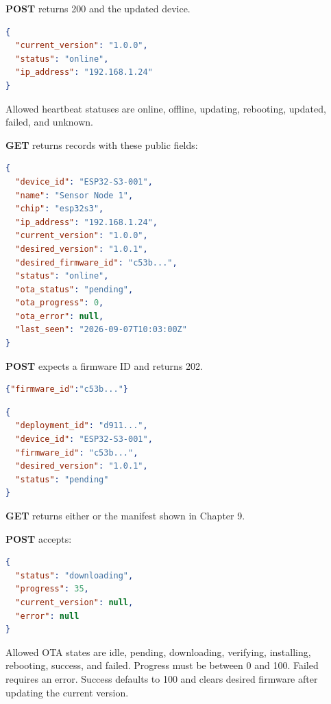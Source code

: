\textbf{POST } returns 200 and the updated device.

\begin{lstlisting}[language=JSON,numbers=none]
{
  "current_version": "1.0.0",
  "status": "online",
  "ip_address": "192.168.1.24"
}
\end{lstlisting}

Allowed heartbeat statuses are online, offline, updating, rebooting, updated, failed, and unknown.

\textbf{GET } returns records with these public fields:

\begin{lstlisting}[language=JSON,numbers=none]
{
  "device_id": "ESP32-S3-001",
  "name": "Sensor Node 1",
  "chip": "esp32s3",
  "ip_address": "192.168.1.24",
  "current_version": "1.0.0",
  "desired_version": "1.0.1",
  "desired_firmware_id": "c53b...",
  "status": "online",
  "ota_status": "pending",
  "ota_progress": 0,
  "ota_error": null,
  "last_seen": "2026-09-07T10:03:00Z"
}
\end{lstlisting}

\textbf{POST } expects a firmware ID and returns 202.

\begin{lstlisting}[language=JSON,numbers=none]
{"firmware_id":"c53b..."}
\end{lstlisting}

\begin{lstlisting}[language=JSON,numbers=none]
{
  "deployment_id": "d911...",
  "device_id": "ESP32-S3-001",
  "firmware_id": "c53b...",
  "desired_version": "1.0.1",
  "status": "pending"
}
\end{lstlisting}

\textbf{GET } returns either  or the manifest shown in Chapter 9.

\textbf{POST } accepts:

\begin{lstlisting}[language=JSON,numbers=none]
{
  "status": "downloading",
  "progress": 35,
  "current_version": null,
  "error": null
}
\end{lstlisting}

Allowed OTA states are idle, pending, downloading, verifying, installing, rebooting, success, and failed. Progress must be between 0 and 100. Failed requires an error. Success defaults to 100 and clears desired firmware after updating the current version.

